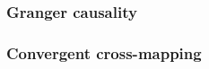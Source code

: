 \documentclass[t]{beamer}
\begin{document}
\begin{frame}
  \frametitle{Granger causality}

  \note{

  }

\end{frame}

\begin{frame}
  \frametitle{Convergent cross-mapping}

  \note{

  }

\end{frame}

\begin{frame}
  \frametitle{}

  \note{

  }

\end{frame}

\begin{frame}
  \frametitle{}

  \note{

  }

\end{frame}

\begin{frame}
  \frametitle{}

  \note{

  }

\end{frame}

\begin{frame}
  \frametitle{}

  \note{

  }

\end{frame}

\begin{frame}
  \frametitle{}

  \note{

  }

\end{frame}

\begin{frame}
  \frametitle{}

  \note{

  }

\end{frame}

\begin{frame}
  \frametitle{}

  \note{

  }

\end{frame}
\end{document}
